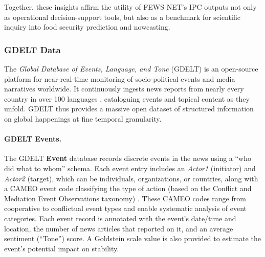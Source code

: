 \documentclass{article}
\begin{document}
Together, these insights affirm the utility of FEWS NET’s IPC outputs not only as operational decision-support tools, but also as a benchmark for scientific inquiry into food security prediction and nowcasting.

\subsubsection{GDELT Data}

The \textit{Global Database of Events, Language, and Tone} (GDELT) is an open-source platform for near-real-time monitoring of socio-political events and media narratives worldwide. It continuously ingests news reports from nearly every country in over 100 languages \citep{gdeltproject,leetaru2013gdelt}, cataloguing events and topical content as they unfold. GDELT thus provides a massive open dataset of structured information on global happenings at fine temporal granularity.

\paragraph{GDELT Events.}
The GDELT \textbf{Event} database records discrete events in the news using a “who did what to whom” schema. Each event entry includes an \textit{Actor1} (initiator) and \textit{Actor2} (target), which can be individuals, organizations, or countries, along with a CAMEO event code classifying the type of action (based on the Conflict and Mediation Event Observations taxonomy) \citep{leetaru2013gdelt}. These CAMEO codes range from cooperative to conflictual event types and enable systematic analysis of event categories. Each event record is annotated with the event’s date/time and location, the number of news articles that reported on it, and an average sentiment (“Tone”) score. A Goldstein scale value is also provided to estimate the event’s potential impact on stability.
\end{document}
